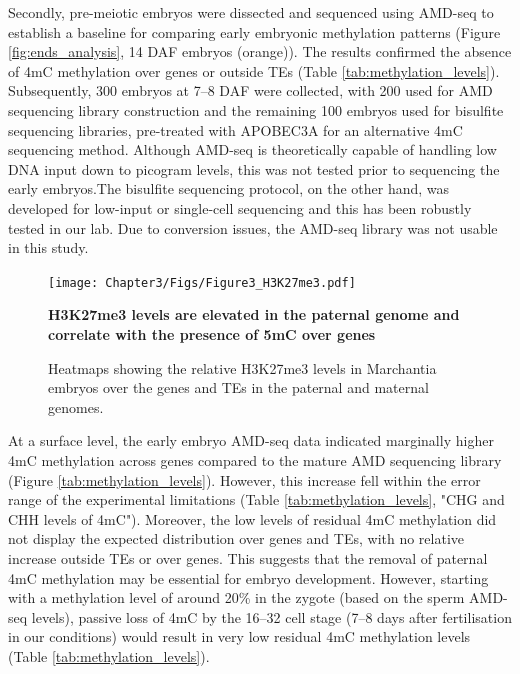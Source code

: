 Secondly, pre-meiotic embryos were dissected and sequenced using AMD-seq to establish a baseline for comparing early embryonic methylation patterns (Figure \ref{fig:ends_analysis}, 14 DAF embryos (orange)). The results confirmed the absence of 4mC methylation over genes or outside TEs (Table \ref{tab:methylation_levels}). Subsequently, 300 embryos at 7–8 DAF were collected, with 200 used for AMD sequencing library construction and the remaining 100 embryos used for bisulfite sequencing libraries, pre-treated with APOBEC3A for an alternative 4mC sequencing method. Although AMD-seq is theoretically capable of handling low DNA input down to picogram levels\citep{idtdna_methylseq_kit}, this was not tested prior to sequencing the early embryos.The bisulfite sequencing protocol, on the other hand, was developed for low-input or single-cell sequencing and this has been robustly tested in our lab. Due to conversion issues, the AMD-seq library was not usable in this study. 

\begin{figure}[htbp!] 
\centering    
    \texttt{[image: Chapter3/Figs/Figure3\_H3K27me3.pdf]}
\caption{\textbf{H3K27me3 levels are elevated in the paternal genome and correlate with the presence of 5mC over genes}}
\label{fig:h3k27me3}
\captionsetup{font=small}
    \caption*{Heatmaps showing the relative H3K27me3 levels in Marchantia embryos over the genes and TEs in the paternal and maternal genomes.}
\end{figure}

At a surface level, the early embryo AMD-seq data indicated marginally higher 4mC methylation across genes compared to the mature AMD sequencing library (Figure \ref{tab:methylation_levels}). However, this increase fell within the error range of the experimental limitations (Table \ref{tab:methylation_levels}, "CHG and CHH levels of 4mC"). Moreover, the low levels of residual 4mC methylation did not display the expected distribution over genes and TEs, with no relative increase outside TEs or over genes. This suggests that the removal of paternal 4mC methylation may be essential for embryo development. However, starting with a methylation level of around 20\% in the zygote (based on the sperm AMD-seq levels), passive loss of 4mC by the 16–32 cell stage (7–8 days after fertilisation in our conditions) would result in very low residual 4mC methylation levels (Table \ref{tab:methylation_levels}). 

